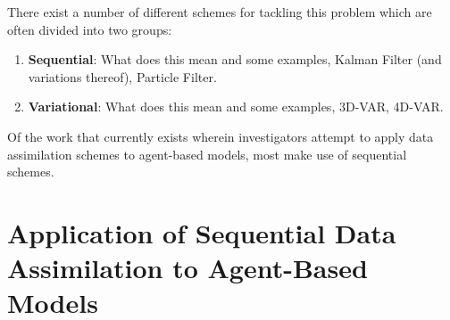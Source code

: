 There exist a number of different schemes for tackling this problem which are
often divided into two groups:
\begin{enumerate}
    \item \textbf{Sequential}: What does this mean and some examples, Kalman
        Filter (and variations thereof), Particle Filter.
    \item \textbf{Variational}: What does this mean and some examples, 3D-VAR,
        4D-VAR.
\end{enumerate}

Of the work that currently exists wherein investigators attempt to apply data
assimilation schemes to agent-based models, most make use of sequential schemes. 

\section[Application of Data Assimilation to Agent-Based Models]{Application of Sequential Data Assimilation to Agent-Based
Models}\label{sec:lit_rev:da_abm}




